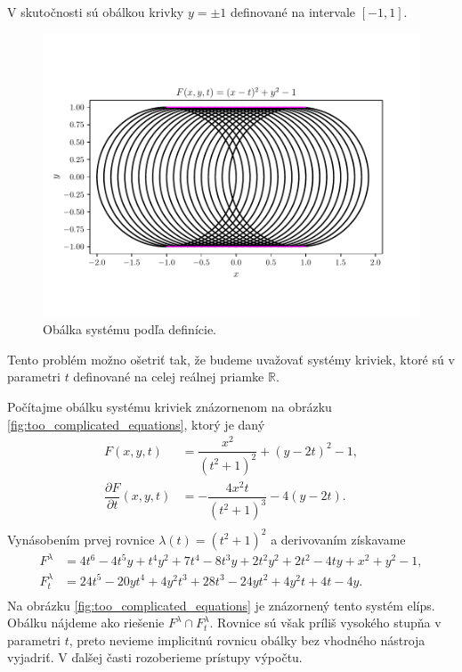 V skutočnosti sú obálkou krivky $y=\pm 1$ definované na intervale $[-1,1]$.

\begin{figure}[H]
	\centering
	\includegraphics{images/system_with_correct_envelope.pdf}
	\caption{Obálka systému podľa definície.}
	\label{fig:system_with_correct_envelope}
\end{figure}

Tento problém možno ošetriť tak, že budeme uvažovať systémy kriviek, ktoré sú v parametri $t$ definované na celej reálnej priamke $\mathbb{R}$. 

\begin{example}
\label{example:too_complicated_equations}
Počítajme obálku systému kriviek znázornenom na obrázku \ref{fig:too_complicated_equations}, ktorý je daný
\begin{align*}
F(x,y, t) &= \dfrac{x^2}{(t^2 + 1)^2} + (y - 2t)^2 - 1, \\
\dfrac{\partial F}{\partial t}(x, y, t) &= -\dfrac{4x^2t}{\left(t^2+1\right)^3}-4\left(y-2t\right). \\
\end{align*}
Vynásobením prvej rovnice $ \lambda(t) = (t^2 + 1)^2$ a derivovaním získavame
\begin{align*}
F^\lambda &= 4 t^6 - 4 t^5 y + t^4 y^2 + 7 t^4 - 8 t^3 y + 2 t^2 y^2 + 2 t^2 - 4 t y + x^2 + y^2 - 1, \\
F_t^\lambda &= 24t^5-20yt^4+4y^2t^3+28t^3-24yt^2+4y^2t+4t-4y. \\
\end{align*}
Na obrázku \ref{fig:too_complicated_equations} je znázornený tento systém elíps. Obálku nájdeme ako riešenie $F^\lambda \cap F_t^\lambda. $ Rovnice sú však príliš vysokého stupňa v parametri $t$, preto nevieme implicitnú rovnicu obálky bez vhodného nástroja vyjadriť. V ďalšej časti rozoberieme prístupy výpočtu.
\end{example}


